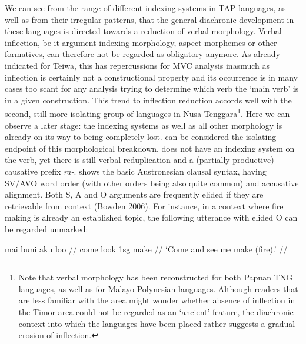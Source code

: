 We can see from the range of different indexing systems in TAP languages, as well as from their irregular patterns, that the general diachronic development in these languages is directed towards a reduction of verbal morphology. Verbal inflection, be it argument indexing morphology, aspect morphemes or other formatives, can therefore not be regarded as obligatory anymore. As already indicated for Teiwa, this has repercussions for MVC analysis inasmuch as inflection is certainly not a constructional property and its occurrence is in many cases too scant for any analysis trying to determine which verb the `main verb' is in a given construction. This trend to inflection reduction accords well with the second, still more isolating group of languages in Nusa Tenggara\footnote{Note that verbal morphology has been reconstructed for both Papuan TNG languages, as well as for Malayo-Polynesian languages. Although readers that are less familiar with the area might wonder whether absence of inflection in the Timor area could not be regarded as an `ancient' feature, the diachronic context into which the languages have been placed rather suggests a gradual erosion of inflection.}. Here we can observe a later stage: the indexing systems as well as all other morphology is already on its way to being completely lost.  can be considered the isolating endpoint of this morphological breakdown.  does not have an indexing system on the verb, yet there is still verbal reduplication and a (partially productive) causative prefix \textit{ra-}.  shows the basic Austronesian clausal syntax, having SV/AVO word order (with other orders being also quite common) and accusative alignment. Both S, A and O arguments are frequently elided if they are retrievable from context (Bowden 2006). For instance, in a context where fire making is already an established topic, the following utterance with elided O can be regarded unmarked:

\ex \label{}
\begingl
\gla mai buni aku loo // 
\glb come look \acs{1}\acs{sg} make //
\glft ‘Come and see me make (fire).’ // 
\endgl
\xe

